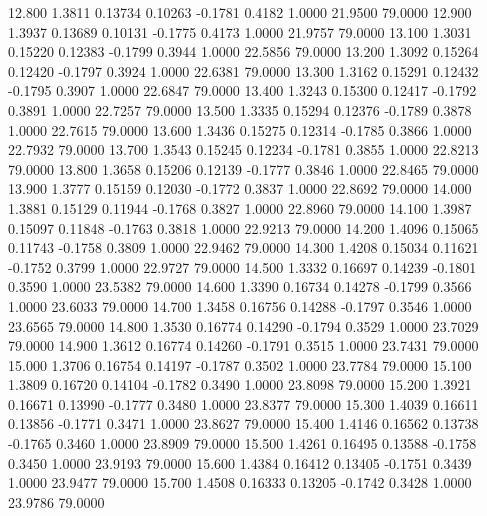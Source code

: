   12.800   1.3811   0.13734   0.10263  -0.1781   0.4182   1.0000  21.9500  79.0000
  12.900   1.3937   0.13689   0.10131  -0.1775   0.4173   1.0000  21.9757  79.0000
  13.100   1.3031   0.15220   0.12383  -0.1799   0.3944   1.0000  22.5856  79.0000
  13.200   1.3092   0.15264   0.12420  -0.1797   0.3924   1.0000  22.6381  79.0000
  13.300   1.3162   0.15291   0.12432  -0.1795   0.3907   1.0000  22.6847  79.0000
  13.400   1.3243   0.15300   0.12417  -0.1792   0.3891   1.0000  22.7257  79.0000
  13.500   1.3335   0.15294   0.12376  -0.1789   0.3878   1.0000  22.7615  79.0000
  13.600   1.3436   0.15275   0.12314  -0.1785   0.3866   1.0000  22.7932  79.0000
  13.700   1.3543   0.15245   0.12234  -0.1781   0.3855   1.0000  22.8213  79.0000
  13.800   1.3658   0.15206   0.12139  -0.1777   0.3846   1.0000  22.8465  79.0000
  13.900   1.3777   0.15159   0.12030  -0.1772   0.3837   1.0000  22.8692  79.0000
  14.000   1.3881   0.15129   0.11944  -0.1768   0.3827   1.0000  22.8960  79.0000
  14.100   1.3987   0.15097   0.11848  -0.1763   0.3818   1.0000  22.9213  79.0000
  14.200   1.4096   0.15065   0.11743  -0.1758   0.3809   1.0000  22.9462  79.0000
  14.300   1.4208   0.15034   0.11621  -0.1752   0.3799   1.0000  22.9727  79.0000
  14.500   1.3332   0.16697   0.14239  -0.1801   0.3590   1.0000  23.5382  79.0000
  14.600   1.3390   0.16734   0.14278  -0.1799   0.3566   1.0000  23.6033  79.0000
  14.700   1.3458   0.16756   0.14288  -0.1797   0.3546   1.0000  23.6565  79.0000
  14.800   1.3530   0.16774   0.14290  -0.1794   0.3529   1.0000  23.7029  79.0000
  14.900   1.3612   0.16774   0.14260  -0.1791   0.3515   1.0000  23.7431  79.0000
  15.000   1.3706   0.16754   0.14197  -0.1787   0.3502   1.0000  23.7784  79.0000
  15.100   1.3809   0.16720   0.14104  -0.1782   0.3490   1.0000  23.8098  79.0000
  15.200   1.3921   0.16671   0.13990  -0.1777   0.3480   1.0000  23.8377  79.0000
  15.300   1.4039   0.16611   0.13856  -0.1771   0.3471   1.0000  23.8627  79.0000
  15.400   1.4146   0.16562   0.13738  -0.1765   0.3460   1.0000  23.8909  79.0000
  15.500   1.4261   0.16495   0.13588  -0.1758   0.3450   1.0000  23.9193  79.0000
  15.600   1.4384   0.16412   0.13405  -0.1751   0.3439   1.0000  23.9477  79.0000
  15.700   1.4508   0.16333   0.13205  -0.1742   0.3428   1.0000  23.9786  79.0000
